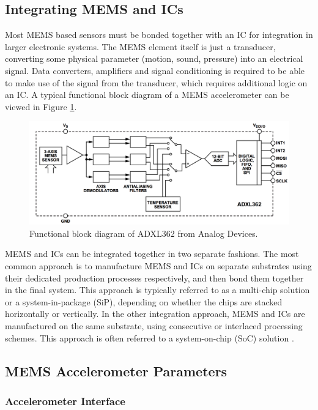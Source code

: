 \subsection{Integrating MEMS and ICs}

Most MEMS based sensors must be bonded together with an IC for integration in larger electronic systems. The MEMS element itself is just a transducer, converting some physical parameter (motion, sound, pressure) into an electrical signal. Data converters, amplifiers and signal conditioning is required to be able to make use of the signal from the transducer, which requires additional logic on an IC. A typical functional block diagram of a MEMS accelerometer can be viewed in Figure \ref{fig:ADXL362_functional}. 

\begin{figure}[h]
\centering
\includegraphics[scale=0.5]{fig/ADXL362_functional_block.png}
\caption{Functional block diagram of ADXL362 from Analog Devices.}
\label{fig:ADXL362_functional}
\end{figure}

MEMS and ICs can be integrated together in two separate fashions. The most common approach is to manufacture MEMS and ICs on separate substrates using their dedicated production processes respectively, and then bond them together in the final system. This approach is typically referred to as a multi-chip solution or a system-in-package (SiP), depending on whether the chips are stacked horizontally or vertically. In the other integration approach, MEMS and ICs are manufactured on the same substrate, using consecutive or interlaced processing schemes. This approach is often referred to a system-on-chip (SoC) solution \cite{fischer15}. 

\subsection{MEMS Accelerometer Parameters}

\subsubsection{Accelerometer Interface}

